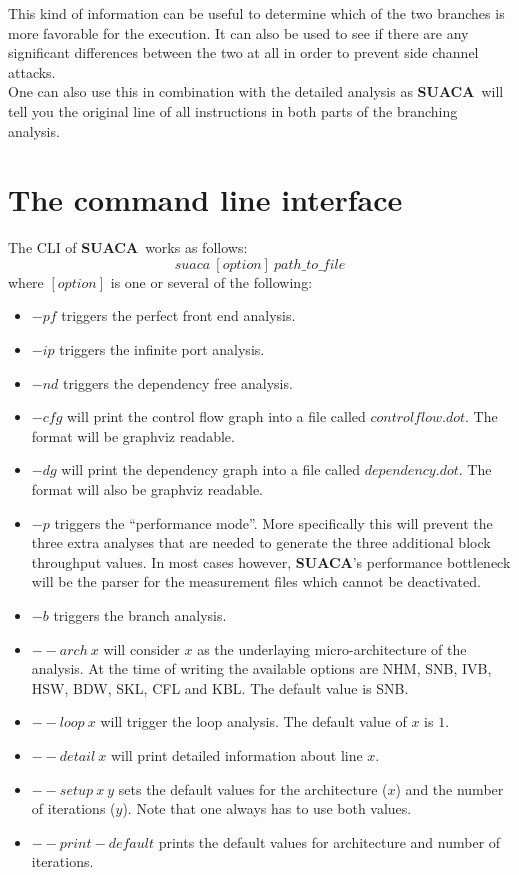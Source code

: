 \documentclass[a4paper,12pt,titlepage, twoside]{report}
\newcommand{\suaca}{\textbf{SUACA}}
\begin{document}
This kind of information can be useful to determine which of the two branches is more favorable for the execution. It can also be used to see if there are any significant differences between the two at all in order to prevent side channel attacks.\\
One can also use this in combination with the detailed analysis as \suaca\ will tell you the original line of all instructions in both parts of the branching analysis.


\section{The command line interface}
The CLI of \suaca\ works as follows:\\
\[
suaca\ [option]\ path\_to\_file
\]
where $[option]$ is one or several of the following:
\begin{itemize}
    \item $-pf$ triggers the perfect front end analysis.
    \item $-ip$ triggers the infinite port analysis.
    \item $-nd$ triggers the dependency free analysis. 
    \item $-cfg$ will print the control flow graph into a file called $controlflow.dot$. The format will be graphviz readable.
    \item $-dg$ will print the dependency graph into a file called $dependency.dot$. The format will also be graphviz readable.
    \item $-p$ triggers the ``performance mode''. More specifically this will prevent the three extra analyses that are needed to generate the three additional block throughput values. In most cases however, \suaca's performance bottleneck will be the parser for the measurement files which cannot be deactivated. 
    \item $-b$ triggers the branch analysis.
    \item ${--}arch\ x$ will consider $x$ as the underlaying micro-architecture of the analysis. At the time of writing the available options are NHM, SNB, IVB, HSW, BDW, SKL, CFL and KBL. The default value is SNB.
    \item ${--}loop\ x$ will trigger the loop analysis. The default value of $x$ is $1$.
    \item ${--}detail\ x$ will print detailed information about line $x$.
     \item ${--}setup\ x\ y$ sets the default values for the architecture ($x$) and the number of iterations ($y$). Note that one always has to use both values. 
    \item ${--}print-default$ prints the default values for architecture and number of iterations.
\end{itemize}
\end{document}
